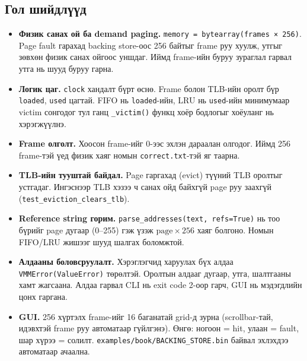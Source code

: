 \subsection{Гол шийдлүүд}
\begin{itemize}
\item \textbf{Физик санах ой ба demand paging.} \texttt{memory = bytearray(frames × 256)}. Page fault гарахад backing store-оос 256 байтыг frame руу хуулж, утгыг зөвхөн физик санах ойгоос уншдаг. Иймд frame-ийн буруу зураглал гарвал утга нь шууд буруу гарна.
\item \textbf{Логик цаг.} \texttt{clock} хандалт бүрт өснө. Frame болон TLB-ийн оролт бүр \texttt{loaded}, \texttt{used} цагтай. FIFO нь \texttt{loaded}-ийн, LRU нь \texttt{used}-ийн минимумаар victim сонгодог тул ганц \texttt{\_victim()} функц хоёр бодлогыг хоёуланг нь хэрэгжүүлнэ.
\item \textbf{Frame олголт.} Хоосон frame-ийг 0-ээс эхлэн дараалан олгодог. Иймд 256 frame-тэй үед физик хаяг номын \texttt{correct.txt}-тэй яг таарна.
\item \textbf{TLB-ийн тууштай байдал.} Page гаргахад (evict) түүний TLB оролтыг устгадаг. Ингэснээр TLB хэзээ ч санах ойд байхгүй page руу заахгүй (\texttt{test\_eviction\_clears\_tlb}).
\item \textbf{Reference string горим.} \texttt{parse\_addresses(text, refs=True)} нь тоо бүрийг page дугаар (0–255) гэж үзэж $\text{page}\times256$ хаяг болгоно. Номын FIFO/LRU жишээг шууд шалгах боломжтой.
\item \textbf{Алдааны боловсруулалт.} Хэрэглэгчид харуулах бүх алдаа \texttt{VMMError(ValueError)} төрөлтэй. Оролтын алдааг дугаар, утга, шалтгааны хамт жагсаана. Алдаа гарвал CLI нь exit code 2-оор гарч, GUI нь мэдэгдлийн цонх гаргана.
\item \textbf{GUI.} 256 хүртэлх frame-ийг 16 баганатай grid-д зурна (scrollbar-тай, идэвхтэй frame руу автоматаар гүйлгэнэ). Өнгө: ногоон = hit, улаан = fault, шар хүрээ = солилт. \texttt{examples/book/BACKING\_STORE.bin} байвал эхлэхдээ автоматаар ачаална.
\end{itemize}

